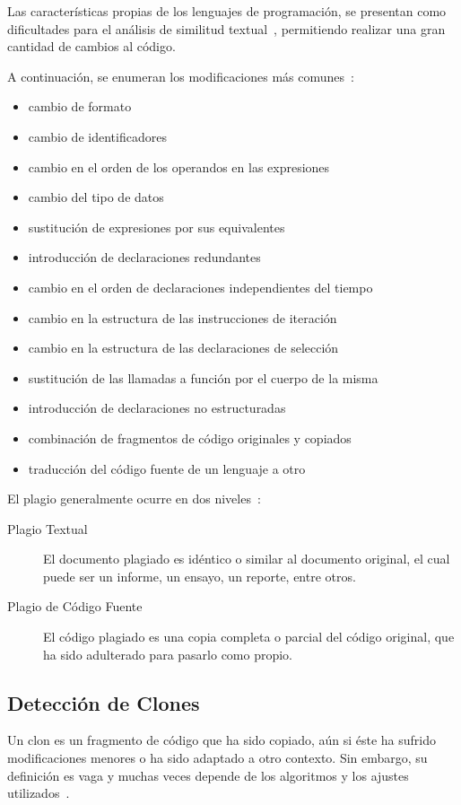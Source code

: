 Las características propias de los lenguajes de programación,
se presentan como dificultades para el análisis de similitud textual~\cite{Beth2014ACO},
permitiendo realizar una gran cantidad de cambios al código.

A continuación, se enumeran los modificaciones más comunes~\cite{Arwin:2006:PDA:1151699.1151730}:

\begin{itemize}
  \item cambio de formato
  \item cambio de identificadores
  \item cambio en el orden de los operandos en las expresiones
  \item cambio del tipo de datos
  \item sustitución de expresiones por sus equivalentes
  \item introducción de declaraciones redundantes
  \item cambio en el orden de declaraciones independientes del tiempo
  \item cambio en la estructura de las instrucciones de iteración
  \item cambio en la estructura de las declaraciones de selección
  \item sustitución de las llamadas a función por el cuerpo de la misma
  \item introducción de declaraciones no estructuradas
  \item combinación de fragmentos de código originales y copiados
  \item traducción del código fuente de un lenguaje a otro
\end{itemize}

\newpage
El plagio generalmente ocurre en dos niveles~\cite{Aggarwal2016}:

\begin{description}
  \item [Plagio Textual] El documento plagiado es idéntico o similar al documento original, el cual puede ser un informe, un ensayo, un reporte, entre otros.
  \item [Plagio de Código Fuente] El código plagiado es una copia completa o parcial del código original, que ha sido adulterado para pasarlo como propio.
\end{description}

\subsection{Detección de Clones}
\label{subsec:plagio}
Un clon es un fragmento de código que ha sido copiado,
aún si éste ha sufrido modificaciones menores
o ha sido adaptado a otro contexto.
Sin embargo, su definición es vaga y muchas veces depende de los algoritmos
y los ajustes utilizados~\cite{Roy07asurvey}.

